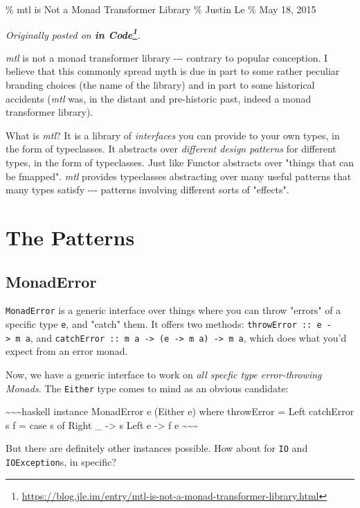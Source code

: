 \documentclass[]{article}
\renewcommand{\href}[2]{#2\footnote{\url{#1}}}
\begin{document}
\% mtl is Not a Monad Transformer Library \% Justin Le \% May 18, 2015

\emph{Originally posted on
\textbf{\href{https://blog.jle.im/entry/mtl-is-not-a-monad-transformer-library.html}{in
Code}}.}

\emph{mtl} is not a monad transformer library -\/-\/- contrary to popular
conception. I believe that this commonly spread myth is due in part to some
rather peculiar branding choices (the name of the library) and in part to some
historical accidents (\emph{mtl} was, in the distant and pre-historic past,
indeed a monad transformer library).

What is \emph{mtl}? It is a library of \emph{interfaces} you can provide to your
own types, in the form of typeclasses. It abstracts over \emph{different design
patterns} for different types, in the form of typeclasses. Just like Functor
abstracts over "things that can be fmapped". \emph{mtl} provides typeclasses
abstracting over many useful patterns that many types satisfy -\/-\/- patterns
involving different sorts of "effects".

\section{The Patterns}

\subsection{MonadError}

\texttt{MonadError} is a generic interface over things where you can throw
"errors" of a specific type \texttt{e}, and "catch" them. It offers two methods:
\texttt{throwError\ ::\ e\ -\textgreater{}\ m\ a}, and
\texttt{catchError\ ::\ m\ a\ -\textgreater{}\ (e\ -\textgreater{}\ m\ a)\ -\textgreater{}\ m\ a},
which does what you'd expect from an error monad.

Now, we have a generic interface to work on \emph{all specfic type
error-throwing Monads}. The \texttt{Either} type comes to mind as an obvious
candidate:

\textasciitilde{}\textasciitilde{}\textasciitilde{}haskell instance MonadError e
(Either e) where throwError = Left catchError s f = case s of Right \_
-\textgreater{} s Left e -\textgreater{} f e
\textasciitilde{}\textasciitilde{}\textasciitilde{}

But there are definitely other instances possible. How about for \texttt{IO} and
\texttt{IOException}s, in specific?
\end{document}
